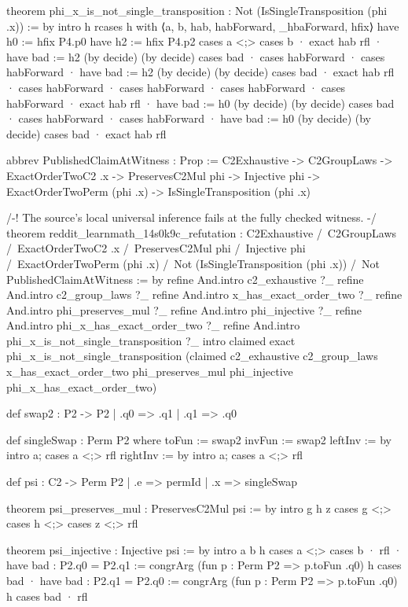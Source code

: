\documentclass[11pt]{article}
\begin{document}
\begin{Vlean}
theorem phi_x_is_not_single_transposition :
    Not (IsSingleTransposition (phi .x)) := by
  intro h
  rcases h with ⟨a, b, hab, habForward, _hbaForward, hfix⟩
  have h0 := hfix P4.p0
  have h2 := hfix P4.p2
  cases a <;> cases b
  · exact hab rfl
  · have bad := h2 (by decide) (by decide)
    cases bad
  · cases habForward
  · cases habForward
  · have bad := h2 (by decide) (by decide)
    cases bad
  · exact hab rfl
  · cases habForward
  · cases habForward
  · cases habForward
  · cases habForward
  · exact hab rfl
  · have bad := h0 (by decide) (by decide)
    cases bad
  · cases habForward
  · cases habForward
  · have bad := h0 (by decide) (by decide)
    cases bad
  · exact hab rfl

abbrev PublishedClaimAtWitness : Prop :=
  C2Exhaustive ->
  C2GroupLaws ->
  ExactOrderTwoC2 .x ->
  PreservesC2Mul phi ->
  Injective phi ->
  ExactOrderTwoPerm (phi .x) ->
  IsSingleTransposition (phi .x)

/-! The source's local universal inference fails at the fully checked witness. -/
theorem reddit_learnmath_14s0k9c_refutation :
    C2Exhaustive /\
    C2GroupLaws /\
    ExactOrderTwoC2 .x /\
    PreservesC2Mul phi /\
    Injective phi /\
    ExactOrderTwoPerm (phi .x) /\
    Not (IsSingleTransposition (phi .x)) /\
    Not PublishedClaimAtWitness := by
  refine And.intro c2_exhaustive ?_
  refine And.intro c2_group_laws ?_
  refine And.intro x_has_exact_order_two ?_
  refine And.intro phi_preserves_mul ?_
  refine And.intro phi_injective ?_
  refine And.intro phi_x_has_exact_order_two ?_
  refine And.intro phi_x_is_not_single_transposition ?_
  intro claimed
  exact phi_x_is_not_single_transposition
    (claimed c2_exhaustive c2_group_laws x_has_exact_order_two
      phi_preserves_mul phi_injective phi_x_has_exact_order_two)

def swap2 : P2 -> P2
  | .q0 => .q1
  | .q1 => .q0

def singleSwap : Perm P2 where
  toFun := swap2
  invFun := swap2
  leftInv := by intro a; cases a <;> rfl
  rightInv := by intro a; cases a <;> rfl

def psi : C2 -> Perm P2
  | .e => permId
  | .x => singleSwap

theorem psi_preserves_mul : PreservesC2Mul psi := by
  intro g h z
  cases g <;> cases h <;> cases z <;> rfl

theorem psi_injective : Injective psi := by
  intro a b h
  cases a <;> cases b
  · rfl
  · have bad : P2.q0 = P2.q1 :=
      congrArg (fun p : Perm P2 => p.toFun .q0) h
    cases bad
  · have bad : P2.q1 = P2.q0 :=
      congrArg (fun p : Perm P2 => p.toFun .q0) h
    cases bad
  · rfl


\end{Vlean}
\end{document}
